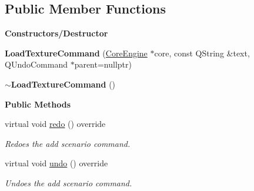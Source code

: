 \subsection*{Public Member Functions}
\begin{Indent}\textbf{ Constructors/\+Destructor}\par
\begin{DoxyCompactItemize}
\item 
\mbox{\label{classrev_1_1_load_texture_command_a81fc79eb7d4c9c438e8de788666da4be}} 
{\bfseries Load\+Texture\+Command} (\mbox{\hyperlink{classrev_1_1_core_engine}{Core\+Engine}} $\ast$core, const Q\+String \&text, Q\+Undo\+Command $\ast$parent=nullptr)
\item 
\mbox{\label{classrev_1_1_load_texture_command_a50d8da48cc1883dd3c7c31faf0f5ca77}} 
{\bfseries $\sim$\+Load\+Texture\+Command} ()
\end{DoxyCompactItemize}
\end{Indent}
\begin{Indent}\textbf{ Public Methods}\par
\begin{DoxyCompactItemize}
\item 
\mbox{\label{classrev_1_1_load_texture_command_abbce212057439e523fc2e5132b6b80db}} 
virtual void \mbox{\hyperlink{classrev_1_1_load_texture_command_abbce212057439e523fc2e5132b6b80db}{redo}} () override
\begin{DoxyCompactList}\small\item\em Redoes the add scenario command. \end{DoxyCompactList}\item 
\mbox{\label{classrev_1_1_load_texture_command_ac46ada6ee8c37c416c6c2edf59709531}} 
virtual void \mbox{\hyperlink{classrev_1_1_load_texture_command_ac46ada6ee8c37c416c6c2edf59709531}{undo}} () override
\begin{DoxyCompactList}\small\item\em Undoes the add scenario command. \end{DoxyCompactList}\end{DoxyCompactItemize}
\end{Indent}

